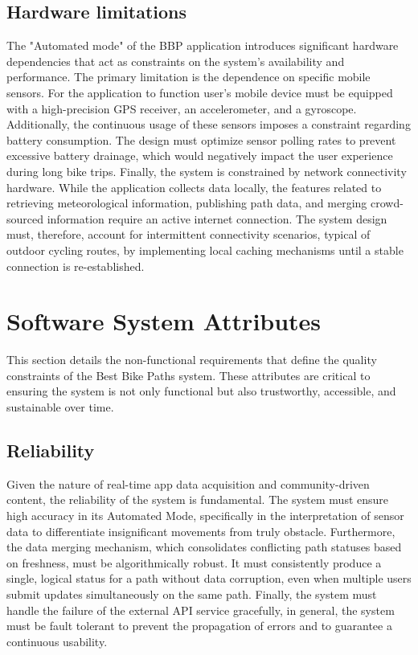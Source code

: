 \subsection{Hardware limitations}
The "Automated mode" of the BBP application introduces significant hardware dependencies that act as constraints on the system's 
availability and performance. The primary limitation is the dependence on specific mobile sensors. For the application to function user's mobile device 
must be equipped with a high-precision GPS receiver, an accelerometer, and a gyroscope. Additionally, the continuous usage of these sensors imposes a constraint 
regarding battery consumption. The design must optimize sensor polling rates to prevent excessive battery drainage, which would negatively impact the user experience 
during long bike trips. Finally, the system is constrained by network connectivity hardware. While the application collects data locally, the features related to 
retrieving meteorological information, publishing path data, and merging crowd-sourced information require an active internet connection. The system design must, 
therefore, account for intermittent connectivity scenarios, typical of outdoor cycling routes, by implementing local caching mechanisms until a stable connection is re-established.

\newpage
\section{Software System Attributes}
This section details the non-functional requirements that define the quality constraints of the Best Bike Paths system. These attributes are critical to ensuring the system 
is not only functional but also trustworthy, accessible, and sustainable over time.

\subsection{Reliability}
Given the nature of real-time app data acquisition and community-driven content, the reliability of the system is fundamental. The system must ensure high accuracy in its Automated Mode, 
specifically in the interpretation of sensor data to differentiate insignificant movements from truly obstacle.
Furthermore, the data merging mechanism, which consolidates conflicting path statuses based on freshness, must be algorithmically robust. It must consistently produce a single, 
logical status for a path without data corruption, even when multiple users submit updates simultaneously on the same path. Finally, the system must handle the failure of the external 
API service gracefully, in general, the system must be fault tolerant to prevent the propagation of errors and to guarantee a continuous usability.

